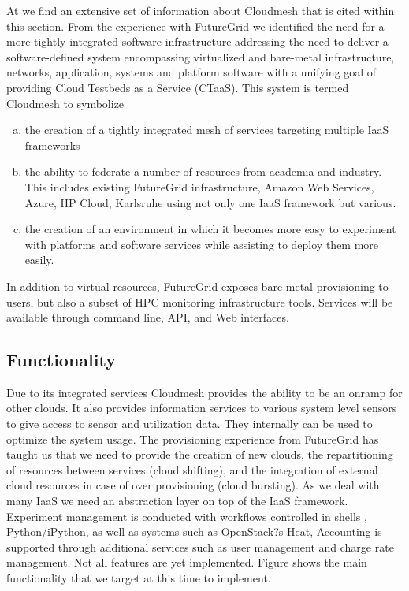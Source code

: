 \documentclass{tex/sig-alternate-2013}
\begin{document}
At \cite{github-cloudmesh} we find an extensive set of information about Cloudmesh that is cited within this section. 
From the experience with FutureGrid we identified the need for a more tightly integrated software infrastructure addressing the need to deliver a software-defined system encompassing virtualized and bare-metal infrastructure, networks, application, systems and platform software with a unifying goal of providing Cloud Testbeds as a Service (CTaaS). This system is termed Cloudmesh to symbolize 


\begin{enumerate}[(a)]


\item the creation of a tightly integrated mesh of services targeting multiple IaaS frameworks 


\item the ability to federate a number of resources from academia and industry. This includes existing FutureGrid infrastructure, Amazon Web Services, Azure, HP Cloud, Karlsruhe using not only one IaaS framework but various. 


\item the creation of an environment in which it becomes more easy to experiment with platforms and software services while assisting to deploy them more easily.  


\end{enumerate}


In addition to virtual resources, FutureGrid exposes bare-metal provisioning to users, but also a subset of HPC monitoring infrastructure tools. Services will be available through command line, API, and Web interfaces.


\subsection{Functionality}


Due to its integrated services Cloudmesh provides the ability to be an onramp for other clouds. It also provides information services to various system level sensors to give access to sensor and utilization data. They internally can be used to optimize the system usage. The provisioning experience from FutureGrid has taught us that we need to provide the creation of new clouds, the repartitioning of resources between services (cloud shifting), and the integration of external cloud resources in case of over provisioning (cloud bursting). As we deal with many IaaS we need an abstraction layer on top of the IaaS framework. Experiment management is conducted with workflows controlled in shells \cite{cmd3}, Python/iPython, as well as systems such as OpenStack?s Heat, Accounting is supported through additional services such as user management and charge rate management. Not all features are yet implemented. Figure \label{F:cm-func} shows the main functionality that we target at this time to implement.
\end{document}
